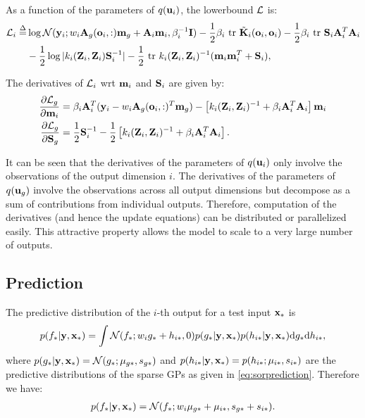 \documentclass{article} %
\begin{document}
\noindent As a function of the parameters of $q(\u_i)$, the lowerbound $\calL$ is:
\begin{align}
\nonumber
\calL_i \define&
 \log \Normal(\y_i; w_i \A_g(\oi,:) \m_g + \A_i \m_i, \beta_i^{-1} \I)
 - \frac{1}{2} \beta_i \trace \tilde{\K}_i(\oi,\oi)
 - \frac{1}{2} \beta_i \trace \S_i \A_i^T \A_i
 \\
  &- \frac{1}{2} \log |k_i(\Zi,\Zi) \S_i^{-1}| -\frac{1}{2} \trace k_i(\Zi,\Zi)^{-1} (\m_i \m_i^T + \S_i) ,
\end{align}

\noindent The derivatives of $\calL_i$ wrt $\m_i$ and $\S_i$ are given by:
\begin{align}
\deriv{\calL_g}{\m_i}
& = \beta_i \A_i^T (\y_i - w_i \A_g(\oi,:)^T \m_g) - \left[k_i(\Zi,\Zi)^{-1} +  \beta_i \A_i^T \A_i \right] \m_i \\
\deriv{\calL_g}{\S_g} 
&= \frac{1}{2} \S_i^{-1} - \frac{1}{2} \left[ k_i(\Zi,\Zi)^{-1} + \beta_i \A_i^T \A_i \right].
\end{align}

\noindent It can be seen that the derivatives of the parameters of $q(\u_i)$ only involve the observations of the output dimension $i$.
The derivatives of the parameters of $q(\u_g)$ involve the observations across all output dimensions but decompose as a sum of contributions from individual outputs.
Therefore, computation of the derivatives (and hence the update equations) can be distributed or parallelized easily.
This attractive property allows the model to scale to a very large number of outputs.

\subsection{Prediction}
The predictive distribution of the $i$-th output for a test input $\x_*$ is 
\begin{align}
p(\fstar | \y, \x_*) = \int \Normal(\fstar; w_i g_* + h_{i*}, 0) p(g_* | \y, \x_*) p(h_{i*} | \y, \x_*) \der g_* \der h_{i*},
\end{align}
where $p(g_* | \y, \x_*) = \Normal(g_*; \mu_{g*}, s_{g*})$ and $p(h_{i*} | \y, \x_*) = p(h_{i*}; \mu_{i*}, s_{i*})$ are the predictive distributions of the sparse GPs as given in \ref{eq:sorprediction}.
Therefore we have:
\begin{align}
p(\fstar | \y, \x_*) = \Normal(\fstar; w_i \mu_{g*} + \mu_{i*}, s_{g*} + s_{i*}). 
\end{align}
\end{document}
